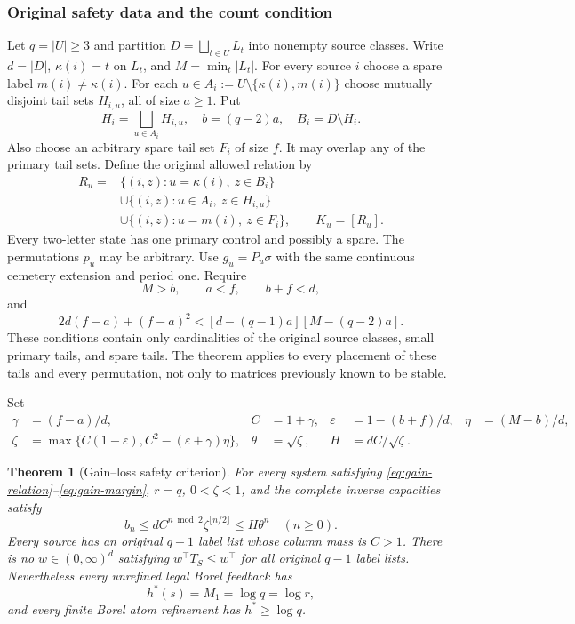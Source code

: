 \documentclass[11pt,reqno]{amsart}
\numberwithin{equation}{section}
\newtheorem{theorem}{Theorem}[section]
\theoremstyle{definition}
\newcommand{\eps}{\varepsilon}
\begin{document}
\subsubsection{Original safety data and the count condition}
Let $q=|U|\ge3$ and partition $D=\bigsqcup_{t\in U}L_t$ into
nonempty source classes. Write $d=|D|$,
$\kappa(i)=t$ on $L_t$, and $M=\min_t|L_t|$.
For every source $i$ choose a spare label $m(i)\ne\kappa(i)$.
For each $u\in A_i:=U\setminus\{\kappa(i),m(i)\}$ choose
mutually disjoint tail sets $H_{i,u}$, all of size $a\ge1$.
Put
\[
 H_i=\bigsqcup_{u\in A_i}H_{i,u},\quad b=(q-2)a,\quad
 B_i=D\setminus H_i.
\]
Also choose an arbitrary spare tail set $F_i$ of size $f$.
It may overlap any of the primary tail sets. Define the original
allowed relation by
\begin{align}
 R_u={}&\{(i,z):u=\kappa(i),\ z\in B_i\}\nonumber\\
 &\cup\{(i,z):u\in A_i,\ z\in H_{i,u}\}\label{eq:gain-relation}\\
 &\cup\{(i,z):u=m(i),\ z\in F_i\},\qquad K_u=[R_u].\nonumber
\end{align}
Every two-letter state has one primary control and possibly a spare.
The permutations $p_u$ may be arbitrary. Use $g_u=P_u\sigma$
with the same continuous cemetery extension and period one.
Require
\begin{equation}\label{eq:gain-counts}
 M>b,\qquad a<f,\qquad b+f<d,
\end{equation}
and
\begin{equation}\label{eq:gain-margin}
 2d(f-a)+(f-a)^2<[d-(q-1)a][M-(q-2)a].
\end{equation}
These conditions contain only cardinalities of the original source
classes, small primary tails, and spare tails. The theorem applies
to every placement of these tails and every permutation, not only
to matrices previously known to be stable.

Set
\begin{align}
 \gamma&=(f-a)/d,& C&=1+\gamma,&
 \eps&=1-(b+f)/d,& \eta&=(M-b)/d,\nonumber\\
 \zeta&=\max\{C(1-\eps),C^2-(\eps+\gamma)\eta\},&
 \theta&=\sqrt\zeta,&H&=dC/\sqrt\zeta.
 \label{eq:gain-constants}
\end{align}

\begin{theorem}[Gain--loss safety criterion]\label{thm:gainloss}
For every system satisfying \eqref{eq:gain-relation}--\eqref{eq:gain-margin},
$r=q$, $0<\zeta<1$, and the complete inverse capacities satisfy
\begin{equation}\label{eq:gain-bn}
 b_n\le dC^{n\bmod2}\zeta^{\lfloor n/2\rfloor}
 \le H\theta^n\quad(n\ge0).
\end{equation}
Every source has an original $q-1$ label list whose column mass is
$C>1$. There is no $w\in(0,\infty)^d$ satisfying
$w^\top T_S\le w^\top$ for all original $q-1$ label lists.
Nevertheless every unrefined legal Borel feedback has
\begin{equation}\label{eq:gain-M}
 h^*(s)=M_1=\log q=\log r,
\end{equation}
and every finite Borel atom refinement has $h^*\ge\log q$.
\end{theorem}
\end{document}

